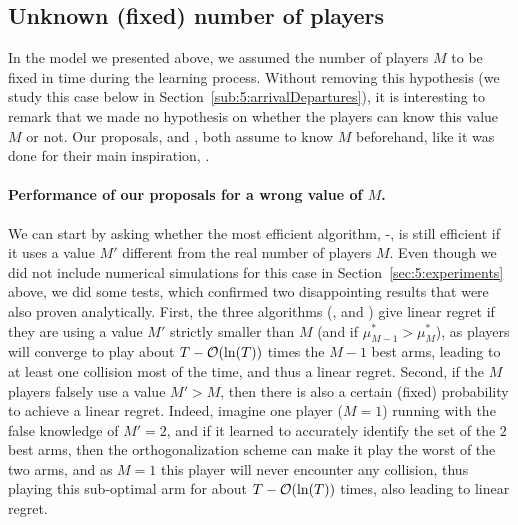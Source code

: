 




\subsection{Unknown (fixed) number of players}
\label{sub:5:unknownNumberOfPlayers}

In the model we presented above, we assumed the number of players $M$ to be fixed in time during the learning process.
Without removing this hypothesis (we study this case below in Section~\ref{sub:5:arrivalDepartures}), it is interesting to remark that we made no hypothesis on whether the players can know this value $M$ or not.
Our proposals, \RandTopM{} and \MCTopM, both assume to know $M$ beforehand, like it was done for their main inspiration, \RhoRand.


\paragraph{Performance of our proposals for a wrong value of $M$.}
\label{par:5:usingWrongValueofM}
%
We can start by asking whether the most efficient algorithm, \MCTopM-\klUCB, is still efficient if it uses a value $M'$ different from the real number of players $M$.
Even though we did not include numerical simulations for this case in Section~\ref{sec:5:experiments} above, we did some tests, which confirmed two disappointing results that were also proven analytically.
First, the three algorithms (\RhoRand, \RandTopM{} and \MCTopM) give linear regret if they are using a value $M'$ strictly smaller than $M$ (and if $\mu^*_{M-1} > \mu^*_M$), as players will converge to play about $T-\mathop{}\mathopen{}\mathcal{O}\mathopen{}\left(\ln(T)\right)$ times the $M-1$ best arms, leading to at least one collision most of the time, and thus a linear regret.
Second, if the $M$ players falsely use a value $M' > M$, then there is also a certain (fixed) probability to achieve a linear regret. Indeed, imagine one player ($M=1$) running \MCTopM{} with the false knowledge of $M'=2$, and if it learned to accurately identify the set of the $2$ best arms, then the \MCTopM{} orthogonalization scheme can make it play the worst of the two arms, and as $M=1$ this player will never encounter any collision, thus playing this sub-optimal arm for about $T-\mathop{}\mathopen{}\mathcal{O}\mathopen{}\left(\ln(T)\right)$ times, also leading to linear regret.


